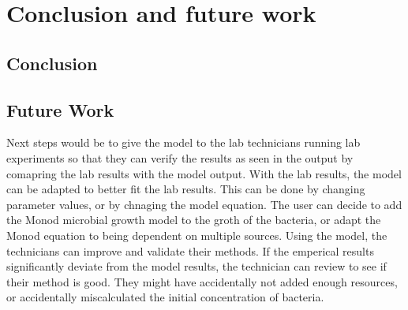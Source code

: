 \chapter{Conclusion and future work}
\label{CAFW}

\section{Conclusion}
\label{Conclusion}

\section{Future Work}
\label{Future Work}
Next steps would be to give the model to the lab technicians running lab experiments so that they can verify the results as seen in the output by comapring the lab results with the model output. 
With the lab results, the model can be adapted to better fit the lab results. 
This can be done by changing parameter values, or by chnaging the model equation. 
The user can decide to add the Monod microbial growth model to the groth of the bacteria, or adapt the Monod equation to being dependent on multiple sources. 
Using the model, the technicians can improve and validate their methods. 
If the emperical results significantly deviate from the model results, the technician can review to see if their method is good. 
They might have accidentally not added enough resources, or accidentally miscalculated the initial concentration of bacteria. 

